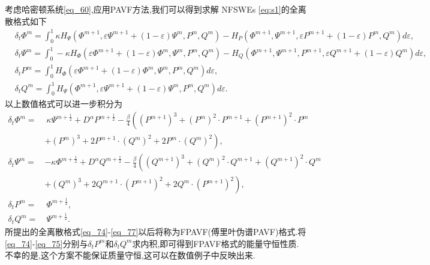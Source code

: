 考虑哈密顿系统\eqref{eq_60},应用PAVF方法,我们可以得到求解 NFSWEs \eqref{eq:s1}的全离散格式如下 \begin{align}
&\delta_{t} \varPhi^{m}\!\!=\!\!\int_{0}^{1}\!\!\kappa H_{\Psi}\!\!\left(\varPhi^{m+1}, \varepsilon \Psi^{m+1}\!\!+\!(1\!\!-\!\varepsilon) \Psi^{m}, P^{m}, Q^{m}\right)\!\!-\!\!H_{P}\!\!\left(\varPhi^{m+1}, \Psi^{m+1}, \varepsilon P^{m+1}\!\!+\!(1\!\!-\!\varepsilon) P^{m}, Q^{m}\right)\!d \varepsilon,\label{eq_70}\\
&\delta_{t} \Psi^{m}\!\!=\!\!\int_{0}^{1}\!\!\!\!-\kappa H_{\varPhi}\!\!\left(\varepsilon \varPhi^{m+1}\!\!+\!(1\!\!-\!\varepsilon) \varPhi^{m}, \Psi^{m}, P^{m}, Q^{m}\right)\!\!-\!\!H_{Q}\!\!\left(\varPhi^{m+1}, \Psi^{m+1}, P^{m+1}, \varepsilon Q^{m+1}\!\!+\!(1\!\!-\!\varepsilon) Q^{m}\right)\!d\varepsilon,\label{eq_71}\\
&\delta_{t} P^{m}\!=\!\int_{0}^{1}\!H_{\varPhi}\left(\varepsilon \varPhi^{m+1}\!+\!(1\!-\!\varepsilon) \varPhi^{m}, \Psi^{m}, P^{m}, Q^{m}\right) d \varepsilon,\label{eq_72}\\
&\delta_{t} Q^{m}\!=\!\int_{0}^{1}\!H_{\Psi}\left(\varPhi^{m+1}, \varepsilon \Psi^{m+1}\!+\!(1\!-\!\varepsilon) \Psi^{m}, P^{m}, Q^{m}\right) d \varepsilon.\label{eq_73}
\end{align}
以上数值格式可以进一步积分为
\begin{align}
\delta_{t} \varPhi^{m}=&~\kappa \Psi^{m+\frac{1}{2}}+D^{\alpha} P^{m+\frac{1}{2}}-\frac{\beta}{4}\left( (P^{m+1})^3+ (P^{m})^{2}\cdot P^{m+1}+(P^{m+1})^{2}\cdot P^{m}\right.\nonumber\\
	&+\left. (P^{m})^{3}+2 P^{m+1}\cdot (Q^{m})^{2}+2 P^{m}\cdot (Q^{m})^{2}\right),\label{eq_74}\\
\delta_{t} \Psi^{m}=&-\kappa \varPhi^{m+\frac{1}{2}}+D^{\alpha} Q^{m+\frac{1}{2}}-\frac{\beta}{4}\left( (Q^{m+1})^3+ (Q^{m})^{2}\cdot Q^{m+1}+(Q^{m+1})^{2}\cdot Q^{m}\right.\nonumber\\
	&+\left. (Q^{m})^{3}+2 Q^{m+1}\cdot (P^{m+1})^{2}+2 Q^{m}\cdot (P^{m+1})^{2}\right),\label{eq_75}\\
\delta_{t} P^{m}=&~\varPhi^{m+\frac{1}{2}},\label{eq_76}\\
\delta_{t} Q^{m}=&~\Psi^{m+\frac{1}{2}}.\label{eq_77}
\end{align}
所提出的全离散格式\eqref{eq_74}-\eqref{eq_77}以后将称为FPAVF(傅里叶伪谱PAVF)格式.将\eqref{eq_74}-\eqref{eq_75}分别与$\delta_t P^{m}$和$\delta_t Q^{m}$求内积,即可得到FPAVF格式的能量守恒性质.不幸的是,这个方案不能保证质量守恒,这可以在数值例子中反映出来.

